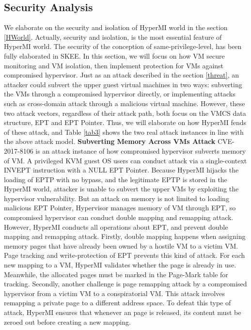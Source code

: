 \documentclass[conference]{IEEEtran}
\begin{document}
\subsection{Security Analysis}
We elaborate on the security and isolation of HyperMI world in the section \ref{HWorld}. Actually, security and isolation, is the most essential feature of HyperMI world. The security of the conception of same-privilege-level, has been fully elaborated in SKEE. 
In this section, we will focus on how VM secure monitoring and VM isolation, then implement protection for VMs against compromised hypervisor. 
Just as an attack described in the section \ref{threat}, an attacker could subvert the upper guest virtual machines in two ways: subverting the VMs through a compromised hypervisor directly, or implementing attacks such as cross-domain attack through a malicious virtual machine. However, these two attack vectors, regardless of their attack path, both focus on the VMCS data structure, EPT and EPT Pointer. Thus, we will elaborate on how HyperMI fends of these attack, and Table \ref{tab3} shows the two real attack instances in line with the above attack model. 
\textbf{Subverting Memory Across VMs Attack}
CVE-2017-8106 is an attack instance of how compromised hypervisor subverts memory of VM. A privileged KVM guest OS users can conduct attack via a single-context INVEPT instruction with a NULL EPT Pointer. Because HyperMI hijacks the loading of EPTP with no bypass, and the legitimate EPTP is stored in the HyperMI world, attacker is unable to subvert the upper VMs by exploiting the hypervisor vulnerability. 
But an attack on memory is not limited to loading malicious EPT Pointer, 
Hypervisor manages memory of VM through EPT, so compromised hypervisor can conduct double mapping and remapping attack. However, HyperMI conducts all operations about EPT, and prevent double mapping and remapping attack.
Firstly, double mapping happens when assigning memory pages that have already been owned by a hostile VM to a victim VM. Page tracking and write-protection of EPT prevents this kind of attack. For each new mapping to a VM, HyperMI validates whether the page is already in use. Meanwhile, the allocated pages must be marked in the Page-Mark table for tracking. Secondly, another challenge is page remapping attack by a compromised hypervisor from a victim VM to a conspiratorial VM. This attack involves remapping a private page to a different address space. To defeat this type of attack, HyperMI ensures that whenever an page is released, its content must be zeroed out before creating a new mapping.
\end{document}
